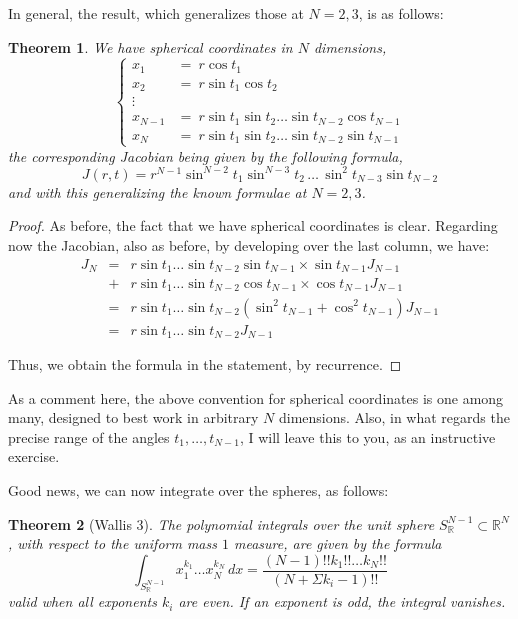 \documentclass[12pt]{amsbook}
\newtheorem{theorem}{Theorem}[chapter]
\begin{document}
In general, the result, which generalizes those at $N=2,3$, is as follows:


\begin{theorem}
We have spherical coordinates in $N$ dimensions,
$$\begin{cases}
x_1\!\!\!&=\ r\cos t_1\\
x_2\!\!\!&=\ r\sin t_1\cos t_2\\
\vdots\\
x_{N-1}\!\!\!&=\ r\sin t_1\sin t_2\ldots\sin t_{N-2}\cos t_{N-1}\\
x_N\!\!\!&=\ r\sin t_1\sin t_2\ldots\sin t_{N-2}\sin t_{N-1}
\end{cases}$$
the corresponding Jacobian being given by the following formula,
$$J(r,t)=r^{N-1}\sin^{N-2}t_1\sin^{N-3}t_2\,\ldots\,\sin^2t_{N-3}\sin t_{N-2}$$
and with this generalizing the known formulae at $N=2,3$.
\end{theorem}

\begin{proof}
As before, the fact that we have spherical coordinates is clear. Regarding now the Jacobian, also as before, by developing over the last column, we have:
\begin{eqnarray*}
J_N
&=&r\sin t_1\ldots\sin t_{N-2}\sin t_{N-1}\times \sin t_{N-1}J_{N-1}\\
&+&r\sin t_1\ldots \sin t_{N-2}\cos t_{N-1}\times\cos t_{N-1}J_{N-1}\\
&=&r\sin t_1\ldots\sin t_{N-2}(\sin^2 t_{N-1}+\cos^2 t_{N-1})J_{N-1}\\
&=&r\sin t_1\ldots\sin t_{N-2}J_{N-1}
\end{eqnarray*}

Thus, we obtain the formula in the statement, by recurrence.
\end{proof}

As a comment here, the above convention for spherical coordinates is one among many, designed to best work in arbitrary $N$ dimensions. Also, in what regards the precise range of the angles $t_1,\ldots,t_{N-1}$, I will leave this to you, as an instructive exercise.

\bigskip

Good news, we can now integrate over the spheres, as follows:


\begin{theorem}[Wallis 3]
The polynomial integrals over the unit sphere $S^{N-1}_\mathbb R\subset\mathbb R^N$, with respect to the uniform mass $1$ measure, are given by the formula
$$\int_{S^{N-1}_\mathbb R}x_1^{k_1}\ldots x_N^{k_N}\,dx=\frac{(N-1)!!k_1!!\ldots k_N!!}{(N+\Sigma k_i-1)!!}$$
valid when all exponents $k_i$ are even. If an exponent is odd, the integral vanishes.
\end{theorem}
\end{document}
